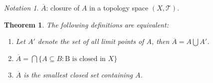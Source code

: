 \documentclass[12pt]{article}
\numberwithin{equation}{section}
\theoremstyle{plain} %
\newtheorem{theorem}[equation]{Theorem}
\theoremstyle{definition}
\theoremstyle{remark}
\newtheorem{notation}[equation]{Notation}
\begin{document}
\begin{notation}
$\overline{A}$: closure of $A$ in a topology space $(X, \mathcal{T})$. 
\end{notation}

\begin{theorem}
	The following definitions are equivalent:
	\begin{enumerate}
		\item  Let $A'$ denote the set of all limit points of $A$, then $\overline{A} = A \bigcup A'$. \label{definition:closure 1}
		\item $\overline{A} = \bigcap \{A \subseteq B: \text{B is closed in }X\}$ \label{definition:closure 2}
		\item $\overline{A}$ is the smallest closed set containing $A$.   
	\end{enumerate}
\end{theorem}
\end{document}
